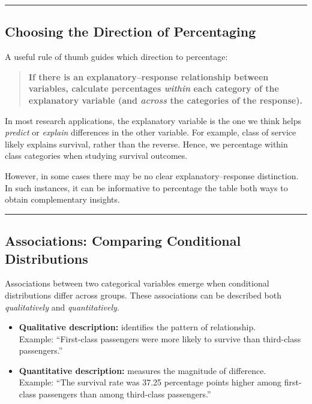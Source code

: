 \documentclass[
  letterpaper,
  DIV=11,
  numbers=noendperiod]{scrreprt}
\begin{document}
\begin{center}\rule{0.5\linewidth}{0.5pt}\end{center}

\subsection{Choosing the Direction of
Percentaging}\label{choosing-the-direction-of-percentaging}

A useful rule of thumb guides which direction to percentage:

\begin{quote}
\textbf{If there is an explanatory--response relationship between
variables, calculate percentages \emph{within} each category of the
explanatory variable (and \emph{across} the categories of the
response).}
\end{quote}

In most research applications, the explanatory variable is the one we
think helps \emph{predict} or \emph{explain} differences in the other
variable. For example, class of service likely explains survival, rather
than the reverse. Hence, we percentage within class categories when
studying survival outcomes.

However, in some cases there may be no clear explanatory--response
distinction. In such instances, it can be informative to percentage the
table both ways to obtain complementary insights.

\begin{center}\rule{0.5\linewidth}{0.5pt}\end{center}

\subsection{Associations: Comparing Conditional
Distributions}\label{associations-comparing-conditional-distributions}

Associations between two categorical variables emerge when conditional
distributions differ across groups. These associations can be described
both \emph{qualitatively} and \emph{quantitatively}.

\begin{itemize}
\item
  \textbf{Qualitative description:} identifies the pattern of
  relationship.\\
  Example: ``First-class passengers were more likely to survive than
  third-class passengers.''
\item
  \textbf{Quantitative description:} measures the magnitude of
  difference.\\
  Example: ``The survival rate was 37.25 percentage points higher among
  first-class passengers than among third-class passengers.''
\end{itemize}
\end{document}
